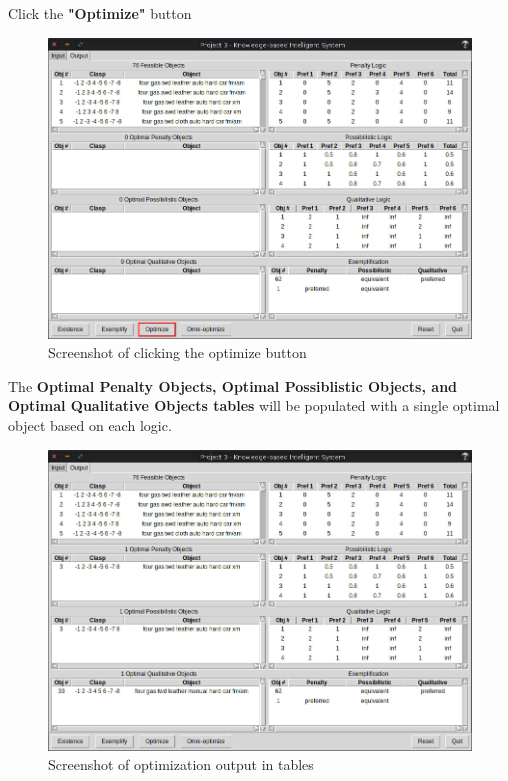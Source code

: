 \documentclass[12pt]{report}
\begin{document}
\begin{description}[leftmargin=4em]
\item [Step 1:]  Click the \textbf{"Optimize"} button
\begin{figure}[H]
\begin{center}
\includegraphics[scale=0.3,trim=1cm 1cm 1cm 1cm]{optimize}
\caption{Screenshot of clicking the optimize button}
\end{center}
\end{figure}
\vspace{-2.5em}
\item [Result:] The \textbf{Optimal Penalty Objects, Optimal Possiblistic Objects, and Optimal Qualitative Objects tables} will be populated with a single optimal object based on each logic.
\begin{figure}[H]
\begin{center}
\includegraphics[scale=0.3,trim=1cm 1cm 1cm 1cm]{post_optimize}
\caption{Screenshot of optimization output in tables}
\end{center}
\end{figure}
\vspace{-2.5em}
\end{description}
\end{document}
